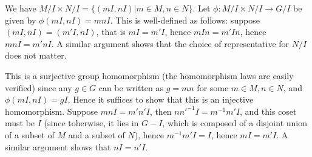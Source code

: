 \documentclass{article}
\def\inv{{-1}}
\begin{document}
We have $M / I \times N / I = \{(mI, nI) | m \in M, n \in N\}$. Let $\phi: M/I \times N/I \to G/I$ be given by $\phi(mI, nI) = mnI$. This is well-defined as follows: suppose $(mI, nI) = (m'I, nI)$, that is $mI = m'I$, hence $mIn = m'In$, hence $mnI = m'nI$. A similar argument shows that the choice of representative for $N/I$ does not matter.

This is a surjective group homomorphism (the homomorphism laws are easily verified) since any $g \in G$ can be written as $g = mn$ for some $m \in M, n \in N$, and $\phi(mI, nI) = gI$. Hence it suffices to show that this is an injective homomorphism. Suppose $mnI = m'n'I$, then $n n'^\inv I = m^\inv m' I$, and this coset must be $I$ (since toherwise, it lies in $G - I$, which is composed of a disjoint union of a subset of $M$ and a subset of $N$), hence $m^\inv m' I = I$, hence $mI = m'I$. A similar argument shows that $nI = n'I$.
\end{document}
